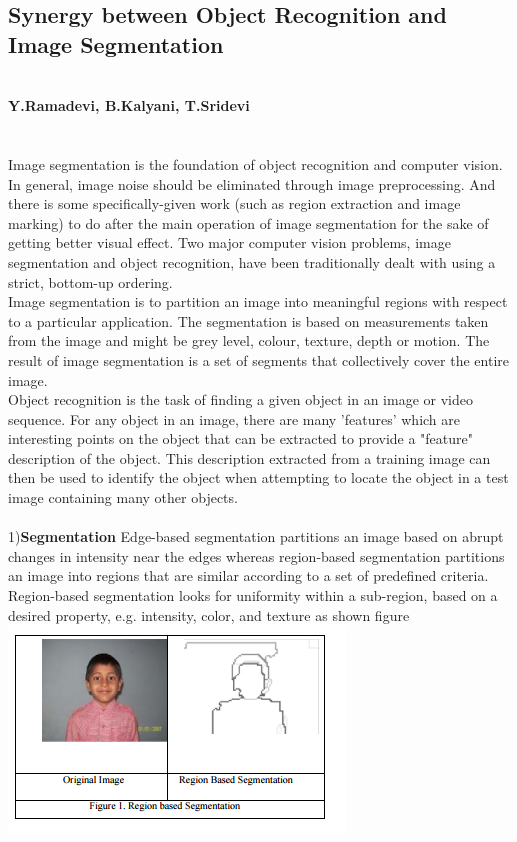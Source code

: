 \documentclass{article}
\begin{document}
\subsection{Synergy between Object Recognition and Image
Segmentation}
\textbf{\small \\Y.Ramadevi, B.Kalyani, T.Sridevi }
\\\\\\
Image segmentation is the foundation of object
recognition and computer vision. In general, image noise
should be eliminated through image preprocessing. And
there is some specifically-given work (such as region
extraction and image marking) to do after the main
operation of image segmentation for the sake of getting
better visual effect. Two major computer vision problems,
image segmentation and object recognition, have been
traditionally dealt with using a strict, bottom-up ordering. \\
Image segmentation is to partition an image into
meaningful regions with respect to a particular
application. The segmentation is based on measurements
taken from the image and might be grey level, colour,
texture, depth or motion. The result of image segmentation
is a set of segments that collectively cover the entire
image.\\
Object recognition is the task of finding a given
object in an image or video sequence. For any object in an
image, there are many 'features' which are interesting
points on the object that can be extracted to provide a
"feature" description of the object. This description
extracted from a training image can then be used to
identify the object when attempting to locate the object in
a test image containing many other objects. \\\\
1)\textbf{Segmentation} Edge-based segmentation partitions an image
based on abrupt changes in intensity near the edges
whereas region-based segmentation partitions an image
into regions that are similar according to a set of
predefined criteria. Region-based segmentation looks for
uniformity within a sub-region, based on a desired
property, e.g. intensity, color, and texture as shown figure
\includegraphics[scale=.5]{1}
\end{document}
